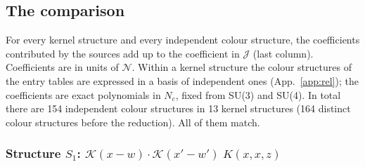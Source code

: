 \documentclass[10pt]{article}
\numberwithin{equation}{section}
\newcommand{\KK}{\mathcal K}
\newcommand{\NN}{\mathcal N}
\newcommand{\J}{\mathcal J}
\begin{document}
\subsection{The comparison}\label{sec:Jmatch}
For every kernel structure and every independent colour structure, the coefficients contributed by the sources add up to the coefficient in $\J$ (last column). Coefficients are in units of $\NN$. Within a kernel structure the colour structures of the entry tables are expressed in a basis of independent ones (App.~\ref{app:rel}); the coefficients are exact polynomials in $N_c$, fixed from SU(3) and SU(4). In total there are 154 independent colour structures in 13 kernel structures (164 distinct colour structures before the reduction). All of them match.
\subsubsection*{Structure $S_{1}$: $\KK(x-w)\cdot\KK(x'-w')\;K(x,x,z)$}
\end{document}

